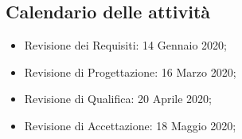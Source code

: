 		\subsection{Calendario delle attività}
		\begin{itemize}
			\item Revisione dei Requisiti: 14 Gennaio 2020;
			\item Revisione di Progettazione: 16 Marzo 2020;
			\item Revisione di Qualifica: 20 Aprile 2020;
			\item Revisione di Accettazione: 18 Maggio 2020;			
		\end{itemize}
